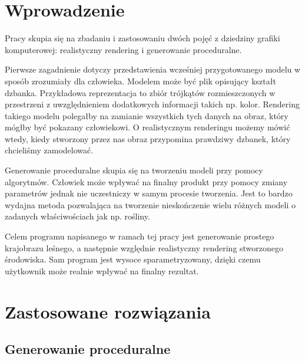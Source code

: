 \documentclass[inz,longabstract]{iithesis}
\author         {Bartosz Rudzki}
\begin{document}
\chapter{Wprowadzenie}
    Pracy skupia się na zbadaniu i zastosowaniu dwóch pojęć z dziedziny grafiki komputerowej: realistyczny rendering i generowanie proceduralne. 
    
    Pierwsze zagadnienie dotyczy przedstawienia wcześniej przygotowanego modelu w sposób zrozumiały dla człowieka. Modelem może być plik opisujący kształt dzbanka. Przykładowa reprezentacja to zbiór trójkątów rozmieszczonych w przestrzeni z uwzględnieniem dodatkowych informacji takich np. kolor. Rendering takiego modelu polegałby na zamianie wszystkich tych danych na obraz, który mógłby być pokazany człowiekowi. O realistycznym renderingu możemy mówić wtedy, kiedy stworzony przez nas obraz przypomina prawdziwy dzbanek, który chcieliśmy zamodelować. 
    
    Generowanie proceduralne skupia się na tworzeniu modeli przy pomocy algorytmów. Człowiek może wpływać na finalny produkt przy pomocy zmiany parametrów jednak nie uczestniczy w samym procesie tworzenia. Jest to bardzo wydajna metoda pozwalająca na tworzenie nieskończenie wielu różnych modeli o zadanych właściwościach jak np. rośliny.
    
    Celem programu napisanego w ramach tej pracy jest generowanie prostego krajobrazu leśnego, a następnie względnie realistyczny rendering stworzonego środowiska. Sam program jest wysoce sparametryzowany, dzięki czemu użytkownik może realnie wpływać na finalny rezultat.
    
\chapter{Zastosowane rozwiązania}
    \section{Generowanie proceduralne}
\end{document}
